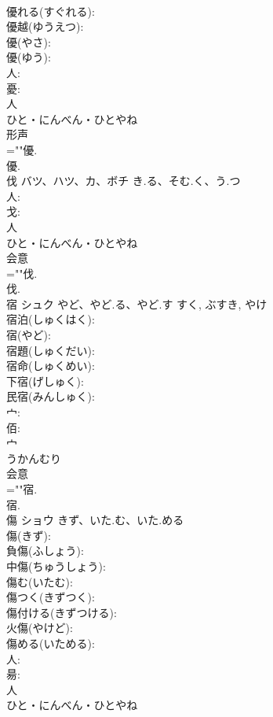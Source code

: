\documentclass[8pt]{extreport}
\begin{document}
\begin{CJK}{UTF8}{min}
\\	優れる(すぐれる): 
\\	優越(ゆうえつ): 
\\	優(やさ): 
\\	優(ゆう): 
\\	人: 
\\	憂: 
\\	人	
\\	ひと・にんべん・ひとやね	
\\	形声 
\\	=""優.
\\	優.
\\	伐	バツ、ハツ、カ、ボチ	き.る、そむ.く、う.つ		
\\	人: 
\\	戈: 
\\	人	
\\	ひと・にんべん・ひとやね	
\\	会意 
\\	=""伐.
\\	伐.
\\	宿	シュク	やど、やど.る、やど.す	すく, ぶすき, やけ	
\\	宿泊(しゅくはく): 
\\	宿(やど): 
\\	宿題(しゅくだい): 
\\	宿命(しゅくめい): 
\\	下宿(げしゅく): 
\\	民宿(みんしゅく): 
\\	宀: 
\\	佰: 
\\	宀	
\\	うかんむり	
\\	会意 
\\	=""宿.
\\	宿.
\\	傷	ショウ	きず、いた.む、いた.める		
\\	傷(きず): 
\\	負傷(ふしょう): 
\\	中傷(ちゅうしょう): 
\\	傷む(いたむ): 
\\	傷つく(きずつく): 
\\	傷付ける(きずつける): 
\\	火傷(やけど): 
\\	傷める(いためる): 
\\	人: 
\\	昜: 
\\	人	
\\	ひと・にんべん・ひとやね	

\end{CJK}
\end{document}
